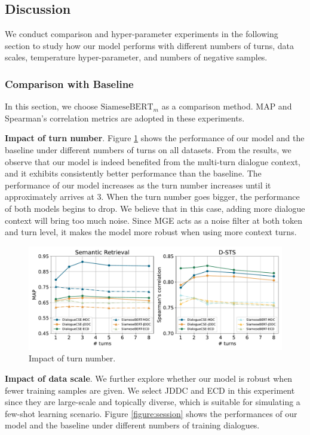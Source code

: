 \documentclass[11pt]{article}
\begin{document}
\subsection{Discussion}
We conduct comparison and hyper-parameter experiments in the following section to study how our model performs with different numbers of turns, data scales, temperature hyper-parameter, and numbers of negative samples.

\subsubsection{Comparison with Baseline}
In this section, we choose $\text{SiameseBERT}_{m}$ as a comparison method.
MAP and Spearman's correlation metrics are adopted in these experiments.

{\textbf{Impact of turn number}}. 
Figure \ref{figure:turn} shows the performance of our model and the baseline under different numbers of turns on all datasets.
From the results, we observe that our model is indeed benefited from the multi-turn dialogue context, and it exhibits consistently better performance than the baseline.
The performance of our model increases as the turn number increases until it approximately arrives at 3.
When the turn number goes bigger, the performance of both models begins to drop.
We believe that in this case, adding more dialogue context will bring too much noise.
Since MGE acts as a noise filter at both token and turn level, it makes the model more robust when using more context turns.

\begin{figure}[htb]
  \centering
  \includegraphics[width=\linewidth]{figures/turn.pdf}
  \caption{Impact of turn number.}
  \label{figure:turn}
\end{figure}

{\textbf{Impact of data scale}}. 
We further explore whether our model is robust when fewer training samples are given.
We select JDDC and ECD in this experiment since they are large-scale and topically diverse, which is suitable for simulating a few-shot learning scenario.
Figure \ref{figure:session} shows the performances of our model and the baseline under different numbers of training dialogues.
\end{document}
